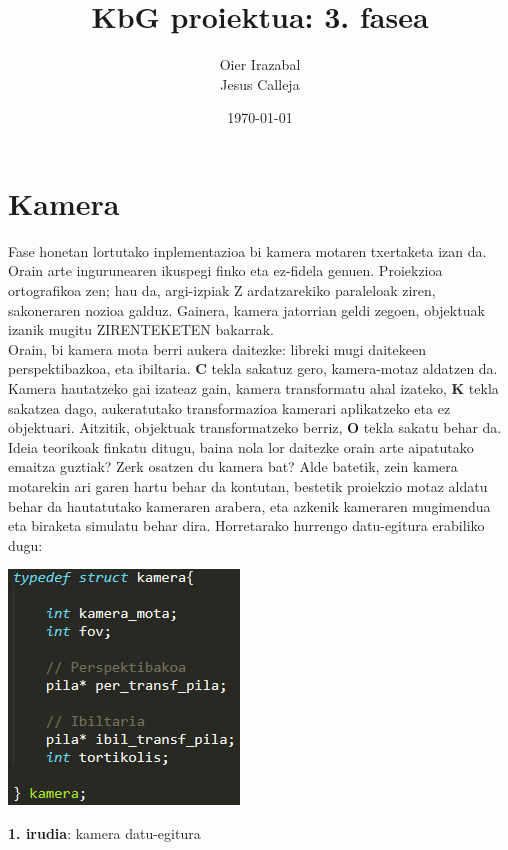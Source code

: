 \documentclass[12pt]{article}
\title{KbG proiektua: 3. fasea}
\author{
        Oier Irazabal\\
        Jesus Calleja
}
\date{\today}
\newcommand{\tekla}[1] {\textbf{#1}}
\begin{document}
\maketitle


\tableofcontents

\vspace{2cm}
\begin{center}
\end{center}

\pagebreak

\section{Kamera}

Fase honetan lortutako inplementazioa bi kamera motaren txertaketa izan da. Orain arte ingurunearen ikuspegi finko eta ez-fidela genuen. Proiekzioa ortografikoa zen; hau da, argi-izpiak Z ardatzarekiko paraleloak ziren, sakoneraren nozioa galduz. Gainera, kamera jatorrian geldi zegoen, objektuak izanik mugitu ZIRENTEKETEN bakarrak.\\

Orain, bi kamera mota berri aukera daitezke: libreki mugi daitekeen perspektibazkoa, eta ibiltaria. \tekla{C} tekla sakatuz gero, kamera-motaz aldatzen da. Kamera hautatzeko gai izateaz gain, kamera transformatu ahal izateko, \tekla{K} tekla sakatzea dago, aukeratutako transformazioa kamerari aplikatzeko eta ez objektuari. Aitzitik, objektuak transformatzeko berriz, \tekla{O} tekla sakatu behar da.\\

Ideia teorikoak finkatu ditugu, baina nola lor daitezke orain arte aipatutako emaitza guztiak? Zerk osatzen du kamera bat?
Alde batetik, zein kamera motarekin ari garen hartu behar da kontutan, bestetik proiekzio motaz aldatu behar da hautatutako kameraren arabera, eta azkenik kameraren mugimendua eta biraketa simulatu behar dira. Horretarako hurrengo datu-egitura erabiliko dugu:

\begin{center}
\includegraphics[scale=1]{kamera_struct.png}

\textbf{1. irudia}: kamera datu-egitura
\end{center}
\end{document}
